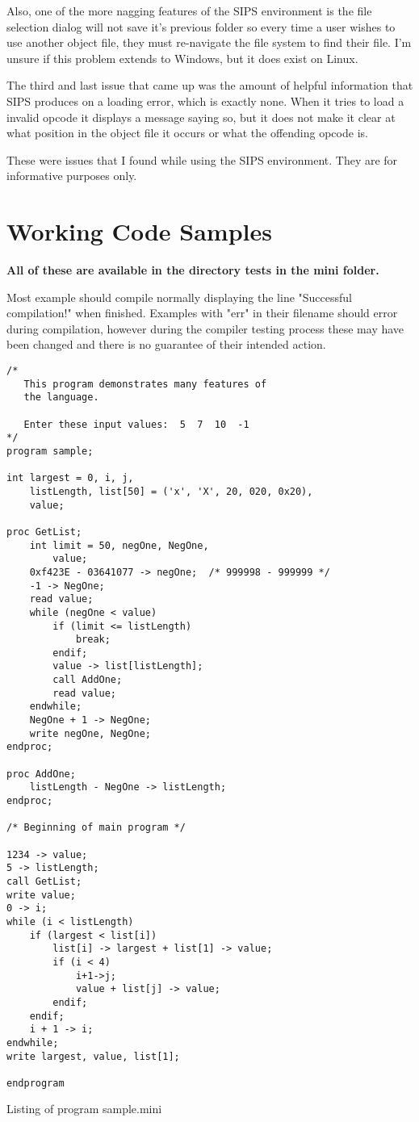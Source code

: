\documentclass[english]{article}
\begin{document}
Also, one of the more nagging features of the SIPS environment is the file selection
dialog will not save it's previous folder so every time a user wishes to use
another object file, they must re-navigate the file system to find their file.  I'm
unsure if this problem extends to Windows, but it does exist on Linux.

The third and last issue that came up was the amount of helpful information that
SIPS produces on a loading error, which is exactly none.  When it tries to load
a invalid opcode it displays a message saying so, but it does not make it clear
at what position in the object file it occurs or what the offending opcode is.

These were issues that I found while using the SIPS environment.  They are for
informative purposes only.

\section{Working Code Samples}

\begin{center}
\textbf{All of these are available in the directory tests in the mini folder.}\\
\end{center}

Most example should compile normally displaying the line "Successful compilation!"
when finished.  Examples with "err" in their filename should error during
compilation, however during the compiler testing process these may have been
changed and there is no guarantee of their intended action.

\begin{program}
\begin{verbatim}
/*
   This program demonstrates many features of
   the language.

   Enter these input values:  5  7  10  -1
*/
program sample;

int largest = 0, i, j,
    listLength, list[50] = ('x', 'X', 20, 020, 0x20),
	value;

proc GetList;
    int limit = 50, negOne, NegOne,
        value;
    0xf423E - 03641077 -> negOne;  /* 999998 - 999999 */
    -1 -> NegOne;
    read value;
    while (negOne < value)
        if (limit <= listLength)
            break;
        endif;
        value -> list[listLength];
        call AddOne;
        read value;
    endwhile;
    NegOne + 1 -> NegOne;
    write negOne, NegOne;
endproc;

proc AddOne;
    listLength - NegOne -> listLength;
endproc;

/* Beginning of main program */

1234 -> value;
5 -> listLength;
call GetList;
write value;
0 -> i;
while (i < listLength)
    if (largest < list[i])
        list[i] -> largest + list[1] -> value;
        if (i < 4)
            i+1->j;
            value + list[j] -> value;
        endif;
    endif;
    i + 1 -> i;
endwhile;
write largest, value, list[1];

endprogram

\end{verbatim}
\caption{Listing of program sample.mini}
\end{program}
\end{document}
